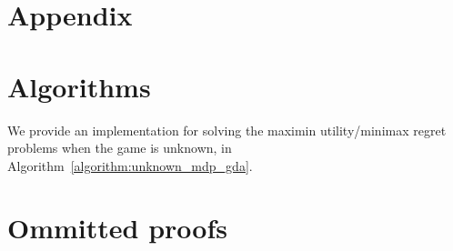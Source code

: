 \section*{Appendix}

\section{Algorithms}
\label{appendix:algorithms}
We provide an implementation for solving the maximin utility/minimax regret problems when the game is unknown, in Algorithm~\ref{algorithm:unknown_mdp_gda}.



\section{Ommitted proofs}

